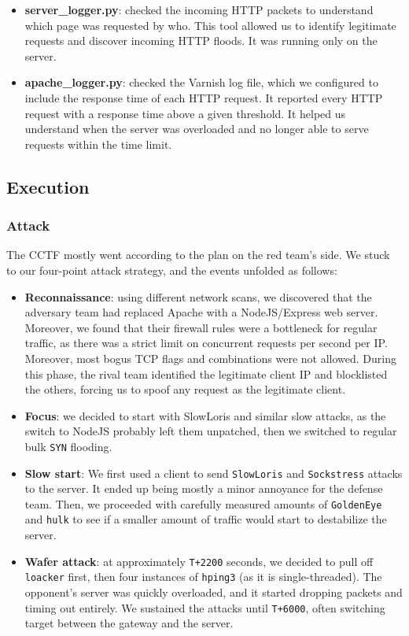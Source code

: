 \begin{itemize}
    \item \textbf{server\_logger.py}: checked the incoming HTTP packets to understand which page was requested by who. This tool allowed us to identify legitimate requests and discover incoming HTTP floods. It was running only on the server.
    \item \textbf{apache\_logger.py}: checked the Varnish log file, which we configured to include the response time of each HTTP request. It reported every HTTP request with a response time above a given threshold. It helped us understand when the server was overloaded and no longer able to serve requests within the time limit.
\end{itemize}

\subsection{Execution}
\label{sec:cctf-resilient:exec}

\subsubsection{Attack}
\label{sec:cctf-resilient:exec:att}

The CCTF mostly went according to the plan on the red team's side. We stuck to our four-point attack strategy, and the events unfolded as follows:

\begin{itemize}
    \item \textbf{Reconnaissance}: using different network scans, we discovered that the adversary team had replaced Apache with a NodeJS/Express web server. Moreover, we found that their firewall rules were a bottleneck for regular traffic, as there was a strict limit on concurrent requests per second per IP. Moreover, most bogus TCP flags and combinations were not allowed. During this phase, the rival team identified the legitimate client IP and blocklisted the others, forcing us to spoof any request as the legitimate client.
    \item \textbf{Focus}: we decided to start with SlowLoris and similar slow attacks, as the switch to NodeJS probably left them unpatched, then we switched to regular bulk \texttt{SYN} flooding.
    \item \textbf{Slow start}: We first used a client to send \texttt{SlowLoris} and \texttt{Sockstress} attacks to the server. It ended up being mostly a minor annoyance for the defense team. Then, we proceeded with carefully measured amounts of \texttt{GoldenEye} and \texttt{hulk} to see if a smaller amount of traffic would start to destabilize the server.
    \item \textbf{Wafer attack}: at approximately \texttt{T+2200} seconds, we decided to pull off \texttt{loacker} first, then four instances of \texttt{hping3} (as it is single-threaded). The opponent's server was quickly overloaded, and it started dropping packets and timing out entirely. We sustained the attacks until \texttt{T+6000}, often switching target between the gateway and the server.
\end{itemize}

